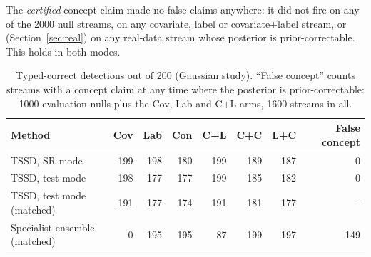 The \emph{certified} concept claim made no false claims anywhere: it did not fire on any of the 2000 null streams, on any covariate, label or covariate+label stream, or (Section~\ref{sec:real}) on any real-data stream whose posterior is prior-correctable. This holds in both modes.

\begin{table}[t]
\centering
\caption{Typed-correct detections out of 200 (Gaussian study). ``False concept'' counts streams with a concept claim at any time where the posterior is prior-correctable: 1000 evaluation nulls plus the Cov, Lab and C+L arms, 1600 streams in all.}
\label{tab:typing}
\small
\begin{tabular}{@{}lrrrrrrr@{}}
\toprule
Method & Cov & Lab & Con & C+L & C+C & L+C & False concept \\
\midrule
TSSD, SR mode & 199 & 198 & 180 & 199 & 189 & 187 & 0 \\
TSSD, test mode & 198 & 177 & 177 & 199 & 185 & 182 & 0 \\
TSSD, test mode (matched) & 191 & 177 & 174 & 191 & 181 & 177 & -- \\
Specialist ensemble (matched) & 0 & 195 & 195 & 87 & 199 & 197 & 149 \\
\bottomrule
\end{tabular}
\end{table}
